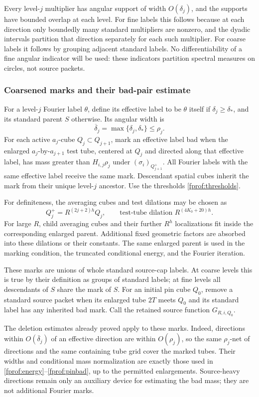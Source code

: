 Every level-\(j\) multiplier has angular support of width
\(O(\delta_j)\), and the supports have bounded overlap at each level.
For fine labels this follows because at each direction only boundedly
many standard multipliers are nonzero, and the dyadic intervals partition
that direction separately for each such multiplier. For coarse labels
it follows by grouping adjacent standard labels. No differentiability
of a fine angular indicator will be used: these indicators partition
spectral measures on circles, not source packets.

\subsubsection*{Coarsened marks and their bad-pair estimate}

For a level-\(j\) Fourier label \(\theta\), define its effective label
to be \(\theta\) itself if \(\delta_j\geq\delta_*\), and its standard
parent \(S\) otherwise. Its angular width is
$$
 \overline\delta_j=\max\{\delta_j,\delta_*\}\leq\rho_j.
$$
For each active \(a_j\)-cube \(Q_j\subset Q_{j+1}\), mark an effective
label bad when the enlarged \(a_j\)-by-\(a_{j+1}\) test tube, centered
at \(Q_j\) and directed along that effective label, has mass greater than
\(H_{i,j}\rho_j\) under \((\sigma_i)_{Q_{j+1}^+}\).
All Fourier labels with the same effective label receive the same mark.
Descendant spatial cubes inherit the mark from their unique level-\(j\)
ancestor. Use the thresholds \eqref{fprof:thresholds}.

For definiteness, the averaging cubes and test dilations may be chosen as
$$
 Q_j^+=R^{(2j+2)h}Q_j,
 \qquad\text{test-tube dilation }R^{(4K_0+20)h}.
$$
For large \(R\), child averaging cubes and their further \(R^h\)
localizations fit inside the corresponding enlarged parent. Additional
fixed geometric factors are absorbed into these dilations or their
constants. The same enlarged parent is used in the marking condition,
the truncated conditional energy, and the Fourier iteration.

These marks are unions of whole standard source-cap labels. At coarse
levels this is true by their definition as groups of standard labels;
at fine levels all descendants of \(S\) share the mark of \(S\).
For an initial pin cube \(Q_0\), remove a standard source packet when
its enlarged tube \(2T\) meets \(Q_0\) and its standard label has any
inherited bad mark. Call the retained source function \(G_{R,i,Q_0}\).

The deletion estimates already proved apply to these marks. Indeed,
directions within \(O(\overline\delta_j)\) of an effective direction
are within \(O(\rho_j)\), so the same \(\rho_j\)-net of directions
and the same containing tube grid cover the marked tubes. Their widths
and conditional mass normalization are exactly those used in
\eqref{fprof:energy}--\eqref{fprof:pinbad}, up to the permitted
enlargements. Source-heavy directions remain only an auxiliary device
for estimating the bad mass; they are not additional Fourier marks.

